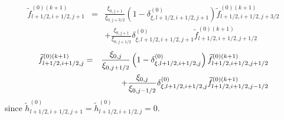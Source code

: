 \begin{eqnarray}
\widetilde{f}_{l+1/2,i+1/2,j+1}^{\left( 0\right) (k+1)} &=&\frac{\xi _{0,j+1}%
}{\xi _{0,j+3/2}}\left( 1-\delta _{\xi ,l+1/2,i+1/2,j+1}^{(0)}\right)
\widetilde{f}_{l+1/2,i+1/2,j+3/2}^{(0)(k+1)}  \nonumber \\
&&+\frac{\xi _{0,j+1}}{\xi _{0,j+1/2}}\delta _{\xi ,l+1/2,i+1/2,j+1}^{(0)}%
\widetilde{f}_{l+1/2,i+1/2,j+1/2}^{(0)(k+1)}
\end{eqnarray}
\begin{eqnarray}
\widetilde{f}_{l+1/2,i+1/2,j}^{\left( 0\right) (k+1)} &=&\frac{\xi _{0,j}}{%
\xi _{0,j+1/2}}\left( 1-\delta _{\xi ,l+1/2,i+1/2,j}^{(0)}\right) \widetilde{%
f}_{l+1/2,i+1/2,j+1/2}^{(0)(k+1)}  \nonumber \\
&&+\frac{\xi _{0,j}}{\xi _{0,j-1/2}}\delta _{\xi ,l+1/2,i+1/2,j}^{(0)}%
\widetilde{f}_{l+1/2,i+1/2,j-1/2}^{(0)(k+1)}
\end{eqnarray}
since $\widetilde{h}_{l+1/2,i+1/2,j+1}^{\left( 0\right) }=\widetilde{h}%
_{l+1/2,i+1/2,j}^{\left( 0\right) }=0.$

